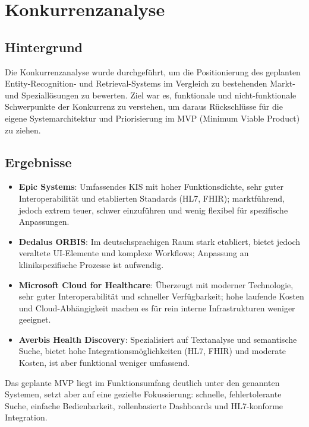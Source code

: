 {\let\clearpage\relax
\chapter{Konkurrenzanalyse}}
\label{sec:konkurrenzanalyse}

\section{Hintergrund}
Die Konkurrenzanalyse wurde durchgeführt, um die Positionierung des geplanten Entity-Recognition- und Retrieval-Systems im Vergleich zu bestehenden Markt- und Speziallösungen zu bewerten. Ziel war es, funktionale und nicht-funktionale Schwerpunkte der Konkurrenz zu verstehen, um daraus Rückschlüsse für die eigene Systemarchitektur und Priorisierung im MVP (Minimum Viable Product) zu ziehen.
\section{Ergebnisse}
\begin{itemize}
	\item \textbf{Epic Systems}: Umfassendes KIS mit hoher Funktionsdichte, sehr guter Interoperabilität und etablierten Standards (HL7, FHIR); marktführend, jedoch extrem teuer, schwer einzuführen und wenig flexibel für spezifische Anpassungen.
	\item \textbf{Dedalus ORBIS}: Im deutschsprachigen Raum stark etabliert, bietet jedoch veraltete UI-Elemente und komplexe Workflows; Anpassung an klinikspezifische Prozesse ist aufwendig.
	\item \textbf{Microsoft Cloud for Healthcare}: Überzeugt mit moderner Technologie, sehr guter Interoperabilität und schneller Verfügbarkeit; hohe laufende Kosten und Cloud-Abhängigkeit machen es für rein interne Infrastrukturen weniger geeignet.
	\item \textbf{Averbis Health Discovery}: Spezialisiert auf Textanalyse und semantische Suche, bietet hohe Integrationsmöglichkeiten (HL7, FHIR) und moderate Kosten, ist aber funktional weniger umfassend.
\end{itemize}
Das geplante MVP liegt im Funktionsumfang deutlich unter den genannten Systemen, setzt aber auf eine gezielte Fokussierung: schnelle, fehlertolerante Suche, einfache Bedienbarkeit, rollenbasierte Dashboards und HL7-konforme Integration.
